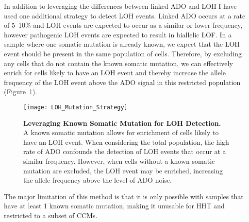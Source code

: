In addition to leveraging the differences between linked ADO and LOH I have used one additional strategy to detect LOH events. Linked ADO occurs at a rate of 5--10\% and LOH events are expected to occur as a similar or lower frequency, however pathogenic LOH events are expected to result in biallelic LOF. In a sample where one somatic mutation is already known, we expect that the LOH event should be present in the same population of cells. Therefore, by excluding any cells that do not contain the known somatic mutation, we can effectively enrich for cells likely to have an LOH event and thereby increase the allele frequency of the LOH event above the ADO signal in this restricted population (Figure~\ref{LOH_Mutation_Strategy}). 
\begin{figure}[tbp!]
\begin{center}
\texttt{[image: LOH\_Mutation\_Strategy]}
\end{center}
\caption[Leveraging Known Somatic Mutation for LOH Detection]{\textbf{Leveraging Known Somatic Mutation for LOH Detection.} \\  A known somatic mutation allows for enrichment of cells likely to have an LOH event. When considering the total population, the high rate of ADO confounds the detection of LOH events that occur at a similar frequency. However, when cells without a known somatic mutation are excluded, the LOH event may be enriched, increasing the allele frequency above the level of ADO noise.  }
\label{LOH_Mutation_Strategy}
\end{figure}
The major limitation of this method is that it is only possible with samples that have at least 1 known somatic mutation, making it unusable for HHT and restricted to a subset of CCMs. 

